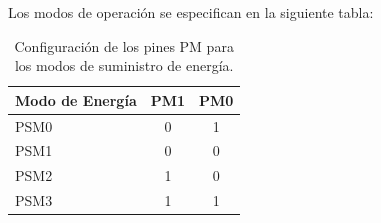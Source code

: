 \documentclass[letterpaper,12pt,oneside]{book}
\begin{document}
			Los modos de operación se especifican en la siguiente tabla:

			\begin{table}[!htpb]
				\centering
				\begin{tabular}{ l | c | c}
					\textbf{Modo de Energía} & \textbf{PM1} & \textbf{PM0}\\
					\hline
					PSM0 & 0 & 1 \\
					PSM1 & 0 & 0 \\
					PSM2 & 1 & 0 \\
					PSM3 & 1 & 1 \\
				\end{tabular}
				\caption[Modos de Suministro de Energía]{Configuración de los pines PM para los modos de suministro de energía.}
			\end{table}
\end{document}
